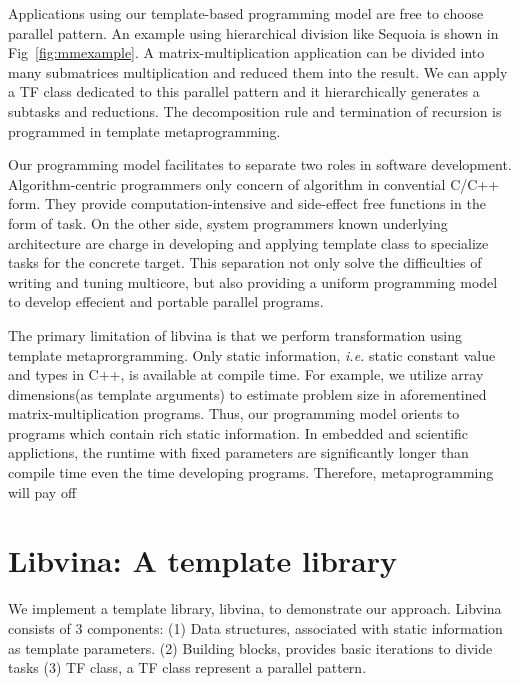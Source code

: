 Applications using our template-based programming model are free to
choose parallel pattern. An example using hierarchical division like
Sequoia is shown in Fig~\ref{fig:mmexample}. A matrix-multiplication application can be divided
into many submatrices multiplication and reduced them into the
result. We can apply a TF class dedicated to this parallel pattern and
it hierarchically generates a subtasks and reductions. The decomposition rule
and termination of recursion is programmed in template
metaprogramming.  

Our programming model facilitates to separate two roles in software
development. Algorithm-centric programmers only concern of algorithm
in convential C/C++ form. They provide computation-intensive and
side-effect free functions in the form of task. On the other side,  system
programmers known underlying architecture are charge in developing and
applying template class to specialize tasks for the concrete
target. This separation not only solve the difficulties of writing and
tuning multicore, but also providing a uniform programming model to
develop effecient and portable parallel programs.

The primary limitation of libvina is that we perform
transformation using template metaprorgramming.  Only static
information, \textit{i.e.} static constant value and types in C++, is
available at compile time. For example, we utilize array
dimensions(as template arguments) to estimate problem size in aforementined
matrix-multiplication programs. Thus, our programming model orients to
programs which contain rich static information. In embedded and
scientific applictions, the runtime with fixed parameters are
significantly longer than compile time even the time developing
programs. Therefore, metaprogramming will pay off 

\section{Libvina: A template library}
We implement a template library, libvina,  to demonstrate our approach. 
Libvina consists of 3 components: (1) Data structures, associated with
static information as template parameters. (2) Building blocks,
provides basic iterations to divide tasks (3) TF class, a TF class
represent a parallel pattern. 

